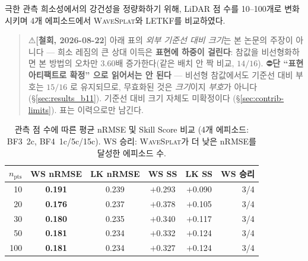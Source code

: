 \documentclass[11pt]{report}
\numberwithin{equation}{chapter}
\numberwithin{figure}{chapter}
\numberwithin{table}{chapter}
\newcommand{\WS}{\textsc{WaveSplat}}
\begin{document}
극한 관측 희소성에서의 강건성을 정량화하기 위해,
LiDAR 점 수를 10--100개로 변화시키며 4개 에피소드에서
\WS{}와 LETKF를 비교하였다.

\begin{quote}
⚠\textbf{[철회, 2026-08-22]} 아래 표의 \emph{외부 기준선 대비 크기}는
본 논문의 주장이 아니다 --- 희소 레짐의 큰 상대 이득은 \textbf{표현에 하중이 걸린다}:
참값을 비선형화하면 본 방법의 오차만 $3.60$배 증가한다(같은 배치 안 짝 비교, $14/16$).
⛔\textbf{단 ``표현 아티팩트로 확정'' 으로 읽어서는 안 된다} --- 비선형 참값에서도
기준선 대비 부호는 $15/16$ 로 유지되므로, 무효화된 것은 \emph{크기}이지 \emph{부호}가
아니다(\S\ref{sec:results_b11}). 기준선 대비 크기 자체도 미확정이다
(\S\ref{sec:contrib-limits}). 표는 이력으로만 남긴다.
\end{quote}
\begin{table}[htbp]
\centering
\caption{관측 점 수에 따른 평균 nRMSE 및 Skill Score 비교
(4개 에피소드: BF3~2c, BF4~1c/5c/15c).
WS 승리: \WS{}가 더 낮은 nRMSE를 달성한 에피소드 수.}
\label{tab:sparse_comparison}
\begin{tabular}{rccccr}
\toprule
$n_{\text{pts}}$ & WS nRMSE & LK nRMSE & WS SS & LK SS & WS 승리 \\
\midrule
10  & \textbf{0.191} & 0.239 & $+$0.293 & $+$0.090 & 3/4 \\
20  & \textbf{0.176} & 0.237 & $+$0.378 & $+$0.105 & 3/4 \\
30  & \textbf{0.180} & 0.235 & $+$0.340 & $+$0.117 & 3/4 \\
50  & \textbf{0.181} & 0.234 & $+$0.332 & $+$0.124 & 3/4 \\
100 & \textbf{0.181} & 0.234 & $+$0.327 & $+$0.124 & 3/4 \\
\bottomrule
\end{tabular}
\end{table}
\end{document}
